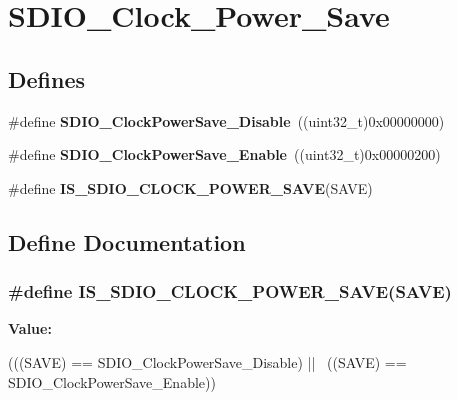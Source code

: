 \hypertarget{group__SDIO__Clock__Power__Save}{
\section{SDIO\_\-Clock\_\-Power\_\-Save}
\label{group__SDIO__Clock__Power__Save}
}
\subsection*{Defines}
\begin{DoxyCompactItemize}
\item 
\hypertarget{group__SDIO__Clock__Power__Save_ga032aa5fb2dfd7ba5dbd60a3845c82ba0}{
\#define {\bfseries SDIO\_\-ClockPowerSave\_\-Disable}~((uint32\_\-t)0x00000000)}
\label{group__SDIO__Clock__Power__Save_ga032aa5fb2dfd7ba5dbd60a3845c82ba0}

\item 
\hypertarget{group__SDIO__Clock__Power__Save_ga9f5b66a0044c4ff36a3eb1ec758f7ea7}{
\#define {\bfseries SDIO\_\-ClockPowerSave\_\-Enable}~((uint32\_\-t)0x00000200)}
\label{group__SDIO__Clock__Power__Save_ga9f5b66a0044c4ff36a3eb1ec758f7ea7}

\item 
\#define {\bfseries IS\_\-SDIO\_\-CLOCK\_\-POWER\_\-SAVE}(SAVE)
\end{DoxyCompactItemize}


\subsection{Define Documentation}
\hypertarget{group__SDIO__Clock__Power__Save_ga41988203e5d4e35a755aa604f1876cd3}{
\subsubsection[{IS\_\-SDIO\_\-CLOCK\_\-POWER\_\-SAVE}]{\setlength{\rightskip}{0pt plus 5cm}\#define IS\_\-SDIO\_\-CLOCK\_\-POWER\_\-SAVE(SAVE)}}
\label{group__SDIO__Clock__Power__Save_ga41988203e5d4e35a755aa604f1876cd3}
{\bfseries Value:}
\begin{DoxyCode}
(((SAVE) == SDIO_ClockPowerSave_Disable) || \
                                        ((SAVE) == SDIO_ClockPowerSave_Enable))
\end{DoxyCode}
